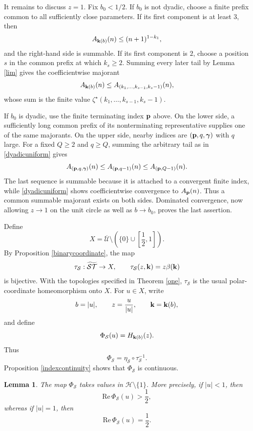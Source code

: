 \documentclass[12pt,a4paper]{amsart}
\makeatletter
\numberwithin{equation}{section}
\renewenvironment{proof}[1][Proof]{%
  \par\pushQED{\qed}%
  \normalfont\topsep6\p@\@plus6\p@\relax
  \trivlist
  \item[\hskip\labelsep\bfseries #1:]\ignorespaces
}{%
  \popQED\endtrivlist\@endpefalse
}
\theoremstyle{plain}
\newtheorem{lem}[Thm]{Lemma}
\theoremstyle{definition}
\makeatother
\begin{document}
\begin{proof}
It remains to discuss $z=1$.  Fix $b_0<1/2$.  If $b_0$ is not dyadic, choose a finite prefix common to all sufficiently close parameters.  If its first component is at least $3$, then
\[
A_{{\bf k}(b)}(n)\leq(n+1)^{1-k_1},
\]
and the right-hand side is summable.  If its first component is $2$, choose a position $s$ in the common prefix at which $k_s\geq2$.  Summing every later tail by Lemma \ref{lim} gives the coefficientwise majorant
\[
A_{{\bf k}(b)}(n)
\leq A_{(k_1,\ldots,k_{s-1},k_s-1)}(n),
\]
whose sum is the finite value
$\zeta^{\star}(k_1,\ldots,k_{s-1},k_s-1)$.

If $b_0$ is dyadic, use the finite terminating index ${\bf p}$ above.  On the lower side, a sufficiently long common prefix of its nonterminating representative supplies one of the same majorants.  On the upper side, nearby indices are $({\bf p},q,{\boldsymbol\gamma})$ with $q$ large.  For a fixed $Q\geq2$ and $q\geq Q$, summing the arbitrary tail as in \eqref{dyadicuniform} gives
\[
A_{({\bf p},q,{\boldsymbol\gamma})}(n)
\leq A_{({\bf p},q-1)}(n)
\leq A_{({\bf p},Q-1)}(n).
\]
The last sequence is summable because it is attached to a convergent finite index, while \eqref{dyadicuniform} shows coefficientwise convergence to $A_{\bf p}(n)$.  Thus a common summable majorant exists on both sides.  Dominated convergence, now allowing $z\rightarrow1$ on the unit circle as well as $b\rightarrow b_0$, proves the last assertion.
\end{proof}

Define
\[
X=\overline{\mathcal{U}}\setminus
\left(\{0\}\cup\left[\frac12,1\right]\right).
\]
By Proposition \ref{binarycoordinate}, the map
\begin{equation}\label{taudef}
\tau_{\mathcal{S}}:\widetilde{\mathcal{ST}}\rightarrow X,
\qquad
\tau_{\mathcal{S}}(z,{\bf k})=z\beta({\bf k})
\end{equation}
is bijective.  With the topologies specified in Theorem \ref{one}, $\tau_{\mathcal{S}}$ is the usual polar-coordinate homeomorphism onto $X$.  For $u\in X$, write
\[
b=|u|,
\qquad z=\frac{u}{|u|},
\qquad {\bf k}={\bf k}(b),
\]
and define
\begin{equation}\label{Phidef}
\Phi_{\mathcal{S}}(u)=H_{{\bf k}(b)}(z).
\end{equation}
Thus
\[
\Phi_{\mathcal{S}}=\eta_{\mathcal{S}}\circ\tau_{\mathcal{S}}^{-1}.
\]
Proposition \ref{indexcontinuity} shows that $\Phi_{\mathcal{S}}$ is continuous.

\begin{lem}\label{halfplaneimage}
The map $\Phi_{\mathcal{S}}$ takes values in $\mathcal{H}\setminus\{1\}$.  More precisely, if $|u|<1$, then
\[
\mathrm{Re}\,\Phi_{\mathcal{S}}(u)>\frac12,
\]
whereas if $|u|=1$, then
\[
\mathrm{Re}\,\Phi_{\mathcal{S}}(u)=\frac12.
\]
\end{lem}
\end{document}
